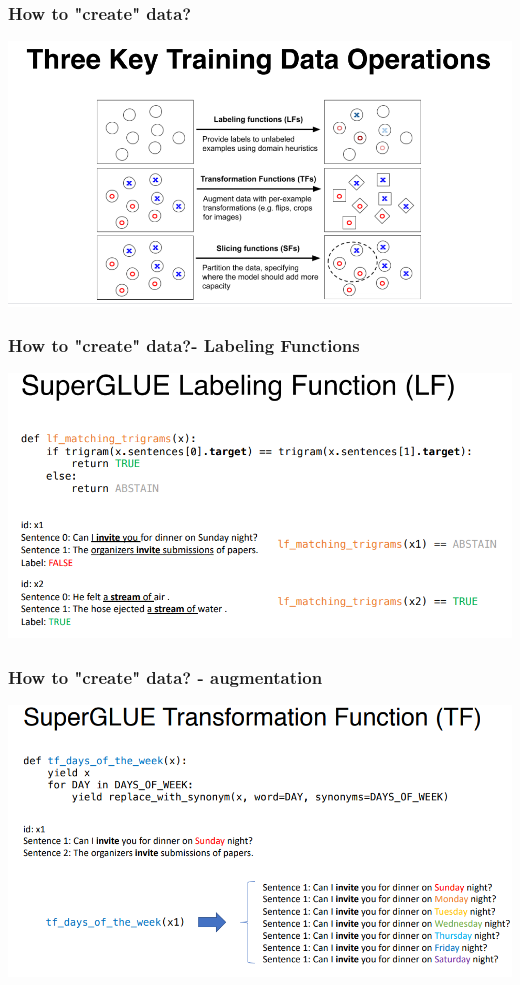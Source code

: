 \documentclass{beamer}
\begin{document}
\begin{frame}
\frametitle{How to "create" data?}
    \includegraphics[width=\textwidth]{figures/3snorkelops.PNG}
\end{frame}

\begin{frame}
\frametitle{How to "create" data?- Labeling Functions}
    \includegraphics[width=\textwidth]{figures/lfexample.PNG}
\end{frame}

\begin{frame}
\frametitle{How to "create" data? - augmentation}
    \includegraphics[width=\textwidth]{figures/tfexample.PNG}
\end{frame}
\end{document}
